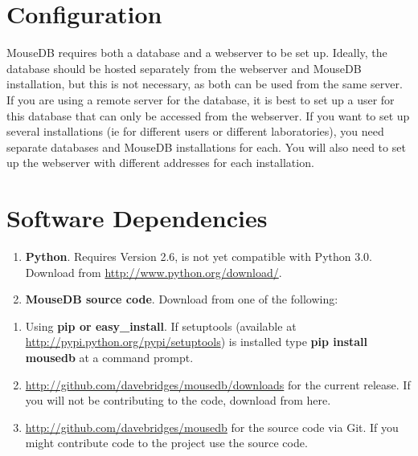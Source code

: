 \documentclass[letterpaper,10pt,english]{sphinxmanual}
\begin{document}
\section{Configuration}
\label{installation:configuration}
MouseDB requires both a database and a webserver to be set up.  Ideally, the database should be hosted separately from the webserver and MouseDB installation, but this is not necessary, as both can be used from the same server.  If you are using a remote server for the database, it is best to set up a user for this database that can only be accessed from the webserver.  If you want to set up several installations (ie for different users or different laboratories), you need separate databases and MouseDB installations for each.  You will also need to set up the webserver with different addresses for each installation.


\section{Software Dependencies}
\label{installation:software-dependencies}\begin{enumerate}
\item {} 
\textbf{Python}.  Requires Version 2.6, is not yet compatible with Python 3.0.  Download from \href{http://www.python.org/download/}{http://www.python.org/download/}.

\item {} 
\textbf{MouseDB source code}.  Download from one of the following:

\end{enumerate}
\begin{enumerate}
\item {} 
Using \textbf{pip or easy\_install}.  If setuptools (available at \href{http://pypi.python.org/pypi/setuptools}{http://pypi.python.org/pypi/setuptools}) is installed type \textbf{pip install mousedb} at a command prompt.

\item {} 
\href{http://github.com/davebridges/mousedb/downloads}{http://github.com/davebridges/mousedb/downloads} for the current release.  If you will not be contributing to the code, download from here.

\item {} 
\href{http://github.com/davebridges/mousedb}{http://github.com/davebridges/mousedb} for the source code via Git.  If you might contribute code to the project use the source code.

\end{enumerate}
\end{document}
